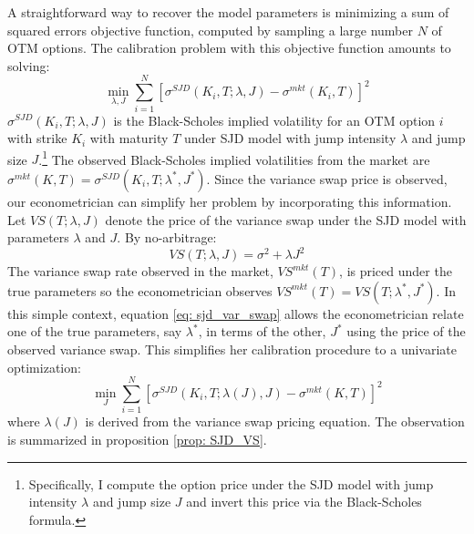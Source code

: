 \documentclass[12pt]{article}
\begin{document}
A straightforward way to recover the model parameters is minimizing a sum of squared errors objective function, computed by sampling a large number $N$ of OTM options. The calibration problem with this objective function amounts to solving:
\begin{equation}\label{eq: SJD_opt}
    \min\limits_{\lambda, J}  \sum\limits_{i=1}^N \left[\sigma^{SJD}(K_i, T; \lambda, J) - \sigma^{mkt}(K_i, T)\right]^2 
\end{equation}
$\sigma^{SJD}(K_i,T; \lambda, J)$ is the Black-Scholes implied volatility for an OTM option $i$ with strike $K_i$ with maturity $T$ under SJD model with jump intensity $\lambda$ and jump size $J$.\footnote{Specifically, I compute the option price under the SJD model with jump intensity $\lambda$ and jump size $J$ and invert this price via the Black-Scholes formula.} The observed Black-Scholes implied volatilities from the market are $ \sigma^{mkt}(K, T) = \sigma^{SJD}(K_i, T; \lambda^*, J^*)$. Since the variance swap price is observed, our econometrician can simplify her problem by incorporating this information. Let $VS(T; \lambda, J)$ denote the price of the variance swap under the SJD model with parameters $\lambda$ and $J$. By no-arbitrage:
\begin{equation}\label{eq: sjd_var_swap}
    VS(T; \lambda, J) = \sigma^2 + \lambda J^2
\end{equation}
The variance swap rate observed in the market, $VS^{mkt}(T)$, is priced under the true parameters so the econometrician observes $VS^{mkt}(T) = VS(T; \lambda^*, J^*)$. In this simple context, equation \eqref{eq: sjd_var_swap} allows the econometrician relate one of the true parameters, say $\lambda^*$, in terms of the other, $J^*$ using the price of the observed variance swap. This simplifies her calibration procedure to a univariate optimization:
\begin{equation}
    \min\limits_{J}  \sum\limits_{i=1}^N \left[\sigma^{SJD}(K_i, T; \lambda(J), J) - \sigma^{mkt}(K, T)\right]^2 
\end{equation}
where $\lambda(J)$ is derived from the variance swap pricing equation. The observation is summarized in proposition \ref{prop: SJD_VS}.
\end{document}

